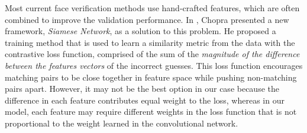 Most current face verification methods use hand-crafted features, which are often combined to improve the validation performance. In \cite{chopra05}, Chopra presented a new framework, \emph{Siamese Network}, as a solution to this problem. He proposed a training method that is used to learn a similarity metric from the data with the contrastive loss function, comprised of the sum of the \emph{magnitude of the difference between the features vectors} of the incorrect guesses. This loss function encourages matching pairs to be close together in feature space while pushing non-matching pairs apart. However, it may not be the best option in our case because the difference in each feature contributes equal weight to the loss, whereas in our model, each feature may require different weights in the loss function that is not proportional to the weight learned in the convolutional network.

